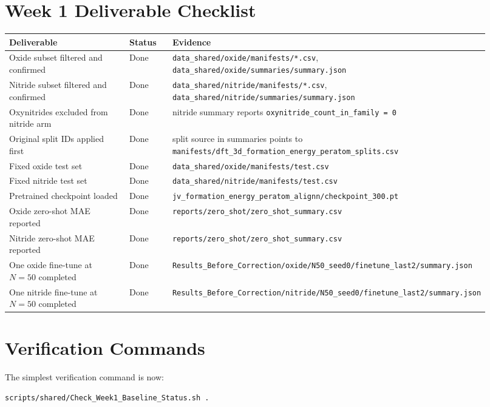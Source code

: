\documentclass[11pt]{article}
\begin{document}
\section{Week 1 Deliverable Checklist}
\begin{longtable}{p{0.34\linewidth}p{0.10\linewidth}p{0.48\linewidth}}
\toprule
Deliverable & Status & Evidence \\
\midrule
Oxide subset filtered and confirmed & Done & \texttt{data\_shared/oxide/manifests/*.csv}, \texttt{data\_shared/oxide/summaries/summary.json} \\
Nitride subset filtered and confirmed & Done & \texttt{data\_shared/nitride/manifests/*.csv}, \texttt{data\_shared/nitride/summaries/summary.json} \\
Oxynitrides excluded from nitride arm & Done & nitride summary reports \texttt{oxynitride\_count\_in\_family = 0} \\
Original split IDs applied first & Done & split source in summaries points to \texttt{manifests/dft\_3d\_formation\_energy\_peratom\_splits.csv} \\
Fixed oxide test set & Done & \texttt{data\_shared/oxide/manifests/test.csv} \\
Fixed nitride test set & Done & \texttt{data\_shared/nitride/manifests/test.csv} \\
Pretrained checkpoint loaded & Done & \texttt{jv\_formation\_energy\_peratom\_alignn/checkpoint\_300.pt} \\
Oxide zero-shot MAE reported & Done & \texttt{reports/zero\_shot/zero\_shot\_summary.csv} \\
Nitride zero-shot MAE reported & Done & \texttt{reports/zero\_shot/zero\_shot\_summary.csv} \\
One oxide fine-tune at $N=50$ completed & Done & \texttt{Results_Before_Correction/oxide/N50\_seed0/finetune\_last2/summary.json} \\
One nitride fine-tune at $N=50$ completed & Done & \texttt{Results_Before_Correction/nitride/N50\_seed0/finetune\_last2/summary.json} \\
\bottomrule
\end{longtable}

\section{Verification Commands}
The simplest verification command is now:
\begin{lstlisting}[language=bash]
scripts/shared/Check_Week1_Baseline_Status.sh .
\end{lstlisting}
\end{document}
